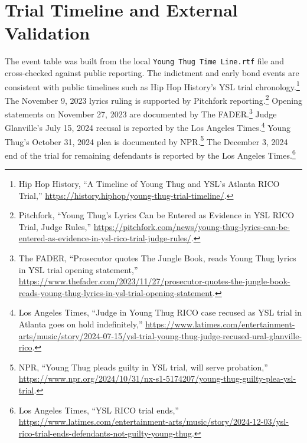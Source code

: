 \documentclass[12pt]{article}
\begin{document}
\section{Trial Timeline and External Validation}
The event table was built from the local \texttt{Young Thug Time Line.rtf} file and cross-checked against public reporting. The indictment and early bond events are consistent with public timelines such as Hip Hop History's YSL trial chronology.\footnote{Hip Hop History, ``A Timeline of Young Thug and YSL's Atlanta RICO Trial,'' \url{https://history.hiphop/young-thug-trial-timeline/}.} The November 9, 2023 lyrics ruling is supported by Pitchfork reporting.\footnote{Pitchfork, ``Young Thug's Lyrics Can be Entered as Evidence in YSL RICO Trial, Judge Rules,'' \url{https://pitchfork.com/news/young-thug-lyrics-can-be-entered-as-evidence-in-ysl-rico-trial-judge-rules/}.} Opening statements on November 27, 2023 are documented by The FADER.\footnote{The FADER, ``Prosecutor quotes The Jungle Book, reads Young Thug lyrics in YSL trial opening statement,'' \url{https://www.thefader.com/2023/11/27/prosecutor-quotes-the-jungle-book-reads-young-thug-lyrics-in-ysl-trial-opening-statement}.} Judge Glanville's July 15, 2024 recusal is reported by the Los Angeles Times.\footnote{Los Angeles Times, ``Judge in Young Thug RICO case recused as YSL trial in Atlanta goes on hold indefinitely,'' \url{https://www.latimes.com/entertainment-arts/music/story/2024-07-15/ysl-trial-young-thug-judge-recused-ural-glanville-rico}.} Young Thug's October 31, 2024 plea is documented by NPR.\footnote{NPR, ``Young Thug pleads guilty in YSL trial, will serve probation,'' \url{https://www.npr.org/2024/10/31/nx-s1-5174207/young-thug-guilty-plea-ysl-trial}.} The December 3, 2024 end of the trial for remaining defendants is reported by the Los Angeles Times.\footnote{Los Angeles Times, ``YSL RICO trial ends,'' \url{https://www.latimes.com/entertainment-arts/music/story/2024-12-03/ysl-rico-trial-ends-defendants-not-guilty-young-thug}.}
\end{document}
